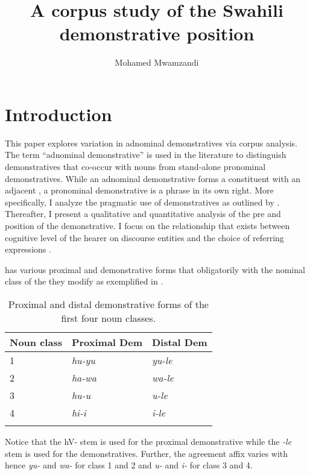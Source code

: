 \documentclass[output=paper,
modfonts
]{langscibook}
\author{Mohamed Mwamzandi}
\title{A corpus study of the Swahili demonstrative position}
\begin{document}
\maketitle

\section{Introduction}\label{sec:mwamzandi:1}

This paper explores variation in  adnominal demonstratives  via corpus analysis. The term ``adnominal demonstrative'' is used in the literature to distinguish demonstratives that co-occur with nouns from stand-alone pronominal demonstratives. While an adnominal demonstrative forms a constituent with an adjacent , a pronominal demonstrative is a  phrase in its own right. More specifically, I analyze the pragmatic use of  demonstratives as outlined by \citet{Fillmore19751971,Fillmore1982,Fillmore1997}. Thereafter, I present a qualitative and quantitative analysis of the pre and  position of the  demonstrative. I focus on the relationship that exists between cognitive level of the hearer on discourse entities and the choice of referring expressions \citep{Chafe1987,Ariel1988,Ariel1991,Ariel2001,GundelEtAl1993}.

 has various proximal and  demonstrative forms that obligatorily  with the nominal class of the  they modify as exemplified in .

\begin{table}
\begin{tabularx}{\textwidth}{XXX}
\lsptoprule
 {\bfseries Noun class} & {\bfseries Proximal Dem} & {\bfseries Distal Dem}\\
\midrule
 1 & \textit{hu-yu} & \textit{yu-le}\\
 2 & \textit{ha-wa} & \textit{wa-le}\\
 3 & \textit{hu-u} & \textit{u-le}\\
 4 & \textit{hi-i} & \textit{i-le}\\
\lspbottomrule
\end{tabularx}

\caption{Proximal and distal demonstrative forms of the first four noun classes.}
\label{tab:mwamzandi:1}
\end{table}

Notice that the hV- stem is used for the proximal demonstrative while the \textit{{}-le} stem is used for the  demonstratives. Further, the agreement affix varies with  hence \textit{yu-} and \textit{wa-} for class 1 and 2 and \textit{u-} and \textit{i-} for class 3 and 4.
\end{document}
